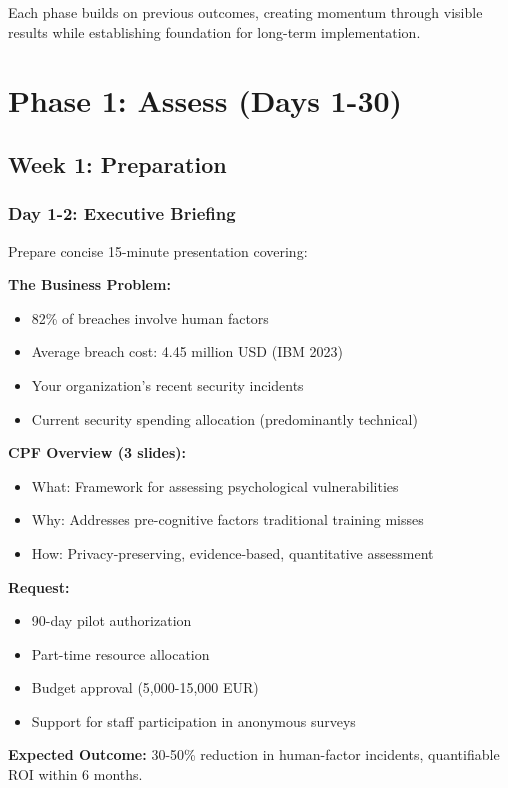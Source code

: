 \documentclass[11pt,a4paper]{article}
\begin{document}
Each phase builds on previous outcomes, creating momentum through visible results while establishing foundation for long-term implementation.

\section{Phase 1: Assess (Days 1-30)}

\subsection{Week 1: Preparation}

\subsubsection{Day 1-2: Executive Briefing}

Prepare concise 15-minute presentation covering:

\textbf{The Business Problem:}
\begin{itemize}
\item 82\% of breaches involve human factors
\item Average breach cost: 4.45 million USD (IBM 2023)
\item Your organization's recent security incidents
\item Current security spending allocation (predominantly technical)
\end{itemize}

\textbf{CPF Overview (3 slides):}
\begin{itemize}
\item What: Framework for assessing psychological vulnerabilities
\item Why: Addresses pre-cognitive factors traditional training misses
\item How: Privacy-preserving, evidence-based, quantitative assessment
\end{itemize}

\textbf{Request:}
\begin{itemize}
\item 90-day pilot authorization
\item Part-time resource allocation
\item Budget approval (5,000-15,000 EUR)
\item Support for staff participation in anonymous surveys
\end{itemize}

\textbf{Expected Outcome:} 30-50\% reduction in human-factor incidents, quantifiable ROI within 6 months.
\end{document}
